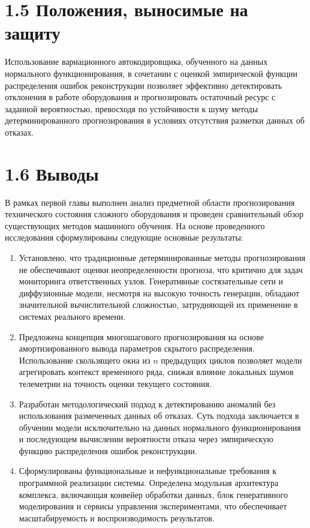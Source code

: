 \documentclass[14pt, a4paper, oneside]{extreport}
\begin{document}
\vspace{1em}
\section{1.5 Положения, выносимые на защиту}
\vspace{1em}
Использование вариационного автокодировщика, обученного на данных нормального функционирования, в сочетании с оценкой эмпирической функции распределения ошибок реконструкции позволяет эффективно детектировать отклонения в работе оборудования и прогнозировать остаточный ресурс с заданной вероятностью, превосходя по устойчивости к шуму методы детерминированного прогнозирования в условиях отсутствия разметки данных об отказах.

\vspace{1em}
\section{1.6 Выводы}
\vspace{1em}

В рамках первой главы выполнен анализ предметной области прогнозирования технического состояния сложного оборудования и проведен сравнительный обзор существующих методов машинного обучения. На основе проведенного исследования сформулированы следующие основные результаты:

\begin{enumerate}
\item Установлено, что традиционные детерминированные методы прогнозирования не обеспечивают оценки неопределенности прогноза, что критично для задач мониторинга ответственных узлов. Генеративные состязательные сети и диффузионные модели, несмотря на высокую точность генерации, обладают значительной вычислительной сложностью, затрудняющей их применение в системах реального времени.

\item Предложена концепция многошагового прогнозирования на основе амортизированного вывода параметров скрытого распределения. Использование скользящего окна из $n$ предыдущих циклов позволяет модели агрегировать контекст временного ряда, снижая влияние локальных шумов телеметрии на точность оценки текущего состояния.

\item Разработан методологический подход к детектированию аномалий без использования размеченных данных об отказах. Суть подхода заключается в обучении модели исключительно на данных нормального функционирования и последующем вычислении вероятности отказа через эмпирическую функцию распределения ошибок реконструкции.

\item Сформулированы функциональные и нефункциональные требования к программной реализации системы. Определена модульная архитектура комплекса, включающая конвейер обработки данных, блок генеративного моделирования и сервисы управления экспериментами, что обеспечивает масштабируемость и воспроизводимость результатов.
\end{enumerate}
\end{document}
